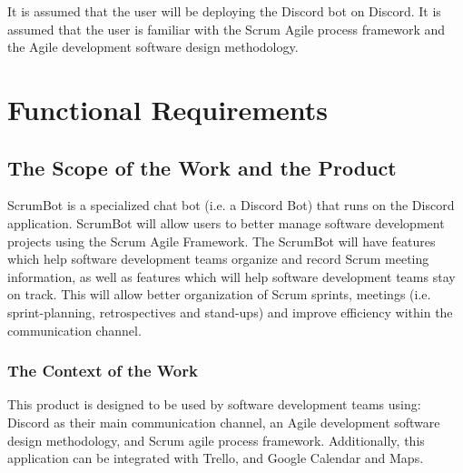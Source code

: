 \documentclass[12pt, titlepage]{article}
\begin{document}
It is assumed that the user will be deploying the Discord bot on Discord. It is assumed that the user is familiar with the Scrum Agile process framework and the Agile development software design methodology.

\section{Functional Requirements}

\subsection{The Scope of the Work and the Product}
ScrumBot is a specialized chat bot (i.e. a Discord Bot) that runs on the Discord application. ScrumBot will allow users to better manage software development projects using the Scrum Agile Framework. The ScrumBot will have features which help software development teams organize and record Scrum meeting information, as well as features which will help software development teams stay on track. This will allow better organization of Scrum sprints, meetings  (i.e. sprint-planning, retrospectives  and  stand-ups) and  improve  efficiency  within  the communication channel.

\subsubsection{The Context of the Work}
This product is designed to be used by software development teams using: Discord as their main communication channel, an Agile development software design methodology, and Scrum agile process framework. Additionally, this application can be integrated with Trello, and Google Calendar and Maps.
\end{document}
